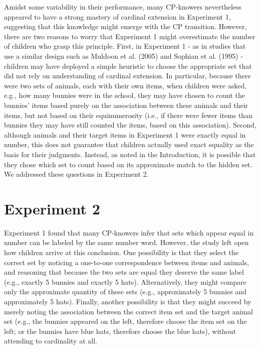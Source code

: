 \documentclass[
  man,floatsintext]{apa7}
\begin{document}
Amidst some variability in their performance, many CP-knowers nevertheless appeared to have a strong mastery of cardinal extension in Experiment 1, suggesting that this knowledge might emerge with the CP transition. However, there are two reasons to worry that Experiment 1 might overestimate the number of children who grasp this principle. First, in Experiment 1 - as in studies that use a similar design such as Muldoon et al. (2005) and Sophian et al. (1995) - children may have deployed a simple heuristic to choose the appropriate set that did not rely on understanding of cardinal extension. In particular, because there were two sets of animals, each with their own items, when children were asked, e.g., how many bunnies were in the school, they may have chosen to count the bunnies' items based purely on the association between these animals and their items, but not based on their equinumerosity (i.e., if there were fewer items than bunnies they may have still counted the items, based on this association). Second, although animals and their target items in Experiment 1 were exactly equal in number, this does not guarantee that children actually used exact equality as the basis for their judgments. Instead, as noted in the Introduction, it is possible that they chose which set to count based on its approximate match to the hidden set. We addressed these questions in Experiment 2.

\section{Experiment 2}\label{experiment-2}

Experiment 1 found that many CP-knowers infer that sets which appear equal in number can be labeled by the same number word. However, the study left open how children arrive at this conclusion. One possibility is that they select the correct set by noticing a one-to-one correspondence between items and animals, and reasoning that because the two sets are equal they deserve the same label (e.g., exactly 5 bunnies and exactly 5 hats). Alternatively, they might compare only the approximate quantity of these sets (e.g., approximately 5 bunnies and approximately 5 hats). Finally, another possibility is that they might succeed by merely noting the association between the correct item set and the target animal set (e.g., the bunnies appeared on the left, therefore choose the item set on the left; or the bunnies have blue hats, therefore choose the blue hats), without attending to cardinality at all.
\end{document}
